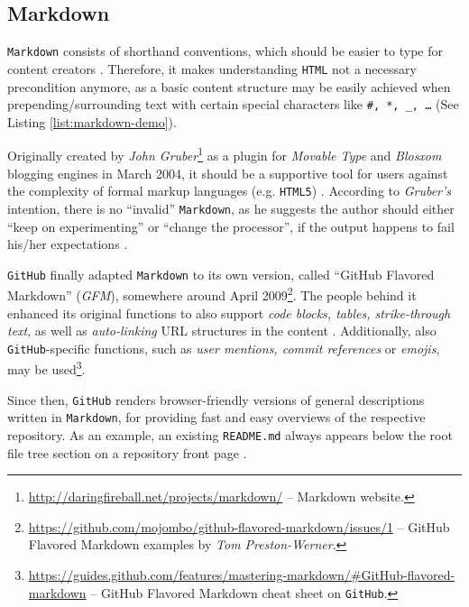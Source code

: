 \subsection{Markdown}
\label{sec:buildpipelines-markdown}



\texttt{Markdown} consists of shorthand conventions, which should be easier to type for content creators  \cite[38]{dhillon2016}.
Therefore, it makes understanding \texttt{HTML} not a necessary precondition anymore, as a basic content structure may be easily achieved when prepending/surrounding text with certain special characters like \texttt{\#, *, \_, \ldots} (See Listing \ref{list:markdown-demo}).

Originally created by \emph{John Gruber}\footnote{\url{http://daringfireball.net/projects/markdown/} -- Markdown website.} as a plugin for \emph{Movable Type} and \emph{Blosxom} blogging engines \cite{Markdown2004introduction} in March 2004, it should be a supportive tool for users against the complexity of formal markup languages (e.g. \texttt{HTML5}) \cite[4]{RFC7764}. According to \emph{Gruber's} intention, there is no ``invalid'' \texttt{Markdown}, as he suggests the author should either ``keep on experimenting'' or ``change the processor'', if the output happens to fail his/her expectations \cite[5]{RFC7764}.

\texttt{GitHub} finally adapted \texttt{Markdown} to its own version, called ``GitHub Flavored Markdown'' (\emph{GFM}), somewhere around April 2009\footnote{\url{https://github.com/mojombo/github-flavored-markdown/issues/1} -- GitHub Flavored Markdown examples by \emph{Tom Preston-Werner}.}. The people behind it enhanced its original functions to also support \emph{code blocks, tables, strike-through text}, as well as \emph{auto-linking} URL structures in the content \cite[18]{RFC7764}. Additionally, also \texttt{GitHub}-specific functions, such as \emph{user mentions, commit references} or \emph{emojis}, may be used\footnote{\url{https://guides.github.com/features/mastering-markdown/\#GitHub-flavored-markdown} -- GitHub Flavored Markdown cheat sheet on \texttt{GitHub}.}.

Since then, \texttt{GitHub} renders browser-friendly versions of general descriptions written in \texttt{Markdown}, for providing fast and easy overviews of the respective repository. As an example, an existing \texttt{README.md} always appears below the root file tree section on a repository front page \cite[5]{gandrud2013github}.
